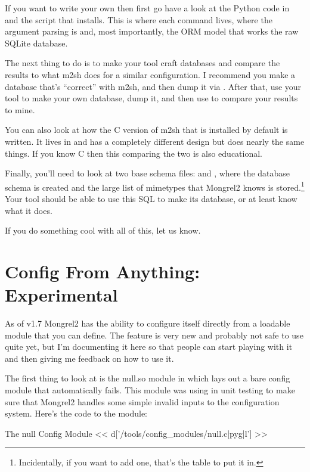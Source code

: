 If you want to write your own  then first go have a look at the
Python code in  and the  script that
installs.  This is where each command lives, where the argument parsing is and,
most importantly, the ORM model that works the raw SQLite database.

The next thing to do is to make your tool craft databases and compare the
results to what m2sh does for a similar configuration.  I recommend you make
a database that's ``correct'' with m2sh, and then dump it via .
After that, use your tool to make your own database, dump it, and then use
 to compare your results to mine.

You can also look at how the C version of m2sh that is installed by default
is written.  It lives in  and has a completely different
design but does nearly the same things.  If you know C then this comparing
the two is also educational.

Finally, you'll need to look at two base schema files:
 and , where
the database schema is created and the large list of mimetypes that
Mongrel2 knows is stored.\footnote{Incidentally, if you want to add one,
that's the table to put it in.}  Your tool should be able to use this
SQL to make its database, or at least know what it does.

If you do something cool with all of this, let us know.


\section{Config From Anything: Experimental}

As of v1.7 Mongrel2 has the ability to configure itself directly from a
loadable module that you can define.  The feature is very new and probably
not safe to use quite yet, but I'm documenting it here so that people
can start playing with it and then giving me feedback on how to use it.

The first thing to look at is the null.so module in 
which lays out a bare config module that automatically fails.  This module was
using in unit testing to make sure that Mongrel2 handles some simple invalid
inputs to the configuration system.  Here's the code to the module:

\begin{code}{The null Config Module}
<< d['/tools/config_modules/null.c|pyg|l'] >>
\end{code}

